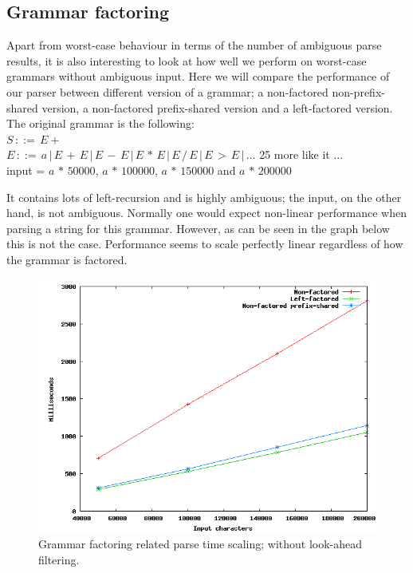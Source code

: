 \documentclass[a4paper,10pt]{article}
\begin{document}
\subsection{Grammar factoring}

Apart from worst-case behaviour in terms of the number of ambiguous parse results, it is also interesting to look at how well we perform on worst-case grammars without ambiguous input. Here we will compare the performance of our parser between different version of a grammar; a non-factored non-prefix-shared version, a non-factored prefix-shared version and a left-factored version. The original grammar is the following:\\
$S\,::=\,E+$\\
$E\,::=\,a\,|\,E\,+\,E\,|\,E\,-\,E\,|\,E\,*\,E\,|\,E\,/\,E\,|\,E\,>\,E\,|\,...$ 25 more like it ...\\
input = $a\,*\,50000$, $a\,*\,100000$, $a\,*\,150000$ and $a\,*\,200000$

It contains lots of left-recursion and is highly ambiguous; the input, on the other hand, is not ambiguous. Normally one would expect non-linear performance when parsing a string for this grammar. However, as can be seen in the graph below this is not the case. Performance seems to scale perfectly linear regardless of how the grammar is factored.

\begin{figure}[H]
\centering
\includegraphics[scale=0.5]{grammar-factoring.png}
\caption{Grammar factoring related parse time scaling; without look-ahead filtering.}
\end{figure}
\end{document}
